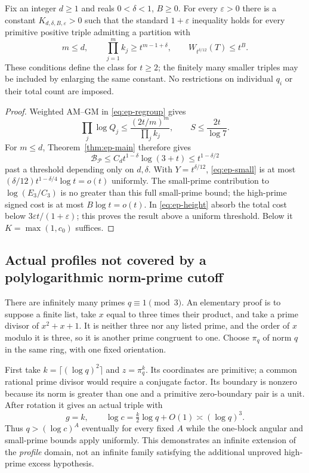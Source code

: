 \begin{theorem}
\label{thm:ep-few}
Fix an integer $d\ge1$ and reals $0<\delta<1$, $B\ge0$.
For every $\varepsilon>0$ there is a constant
$K_{d,\delta,B,\varepsilon}>0$ such that the standard $1+\varepsilon$
inequality holds for every primitive positive triple admitting a partition with
\begin{equation}\label{eq:ep-profile-condition}
 m\le d,\qquad \prod_{j=1}^m k_j\ge t^{m-1+\delta},\qquad
 W_{t^{\delta/12}}(T)\le t^B.
\end{equation}
These conditions define the class for $t\ge2$; the finitely many smaller
triples may be included by enlarging the same constant. No restrictions on
individual $q_i$ or their total count are imposed.
\end{theorem}
\begin{proof}
Weighted AM--GM in \eqref{eq:ep-regroup} gives
\[
 \prod_j\log Q_j\le\frac{(2t/m)^m}{\prod_j k_j},\qquad
 S\le\frac{2t}{\log7}.
\]
For $m\le d$, Theorem~\ref{thm:ep-main} therefore gives
\[
 \mathcal B_{\mathcal P}\le C_d t^{1-\delta}\log(3+t)
 \le t^{1-\delta/2}
\]
past a threshold depending only on $d,\delta$. With $Y=t^{\delta/12}$,
\eqref{eq:ep-small} is at most
$(\delta/12)t^{1-\delta/4}\log t=o(t)$ uniformly. The small-prime contribution to $\log(E_3/C_3)$ is no greater than
this full small-prime bound; the high-prime signed cost is at most
$B\log t=o(t)$. In \eqref{eq:ep-height} absorb the total cost
below $3\varepsilon t/(1+\varepsilon)$; this proves the result above a
uniform threshold. Below it $K=\max(1,c_0)$ suffices.
\end{proof}

\subsection{Actual profiles not covered by a polylogarithmic norm-prime cutoff}
There are infinitely many primes $q\equiv1\pmod3$. An elementary proof is to
suppose a finite list, take $x$ equal to three times their product, and take a
prime divisor of $x^2+x+1$. It is neither three nor any listed prime, and the
order of $x$ modulo it is three, so it is another prime congruent to one.
Choose $\pi_q$ of norm $q$ in the same ring, with one fixed orientation.

First take $k=\lceil(\log q)^2\rceil$ and $z=\pi_q^k$. Its coordinates are
primitive; a common rational prime divisor would require a conjugate factor.
Its boundary is nonzero because its norm is greater than one and a primitive
zero-boundary pair is a unit. After rotation it gives an actual triple with
\[
 g=k,\qquad \log c=\tfrac{k}{2}\log q+O(1)
             \asymp(\log q)^3.
\]
Thus $q>(\log c)^A$ eventually for every fixed $A$ while the one-block
angular and small-prime bounds apply uniformly. This demonstrates an infinite
extension of the \emph{profile} domain, not an infinite family satisfying the
additional unproved high-prime excess hypothesis.

